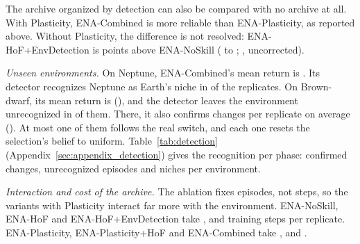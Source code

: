 The archive organized by detection can also be compared with no archive at all. With Plasticity, ENA-Combined is more reliable than ENA-Plasticity, as reported above. Without Plasticity, the difference is not resolved: ENA-HoF+EnvDetection is  points above ENA-NoSkill ( to ; , uncorrected).

\textit{Unseen environments.} On Neptune, ENA-Combined's mean return is . Its detector recognizes Neptune as Earth's niche in  of the  replicates. On Brown-dwarf, its mean return is  (), and the detector leaves the environment unrecognized in  of them. There, it also confirms  changes per replicate on average (). At most one of them follows the real switch, and each one resets the selection's belief to uniform. Table~\ref{tab:detection} (Appendix~\ref{sec:appendix_detection}) gives the recognition per phase: confirmed changes, unrecognized episodes and niches per environment.

\textit{Interaction and cost of the archive.} The ablation fixes episodes, not steps, so the variants with Plasticity interact far more with the environment. ENA-NoSkill, ENA-HoF and ENA-HoF+EnvDetection take ,  and  training steps per replicate. ENA-Plasticity, ENA-Plasticity+HoF and ENA-Combined take ,  and .

